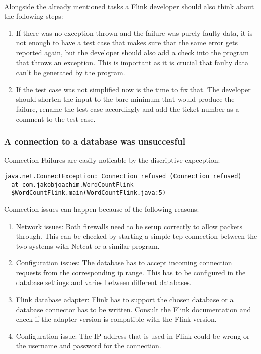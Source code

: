 \paragraph{} Alongside the already mentioned tasks a Flink developer should also think about the following steps:
\begin{enumerate}
  \item If there was no exception thrown and the failure was purely faulty data, it is not enough to have a test case that makes sure that the same error gets reported again, but the developer should also add a check into the program that throws an exception. This is important as it is crucial that faulty data can't be generated by the program.
  \item If the test case was not simplified now is the time to fix that. The developer should shorten the input to the bare minimum that would produce the failure, rename the test case accordingly and add the ticket number as a comment to the test case.
\end{enumerate}

\subsubsection{A connection to a database was unsuccesful}
Connection Failures are easily noticable by the discriptive expecption:
\begin{lstlisting}
java.net.ConnectException: Connection refused (Connection refused)
  at com.jakobjoachim.WordCountFlink
  $WordCountFlink.main(WordCountFlink.java:5)
\end{lstlisting}
Connection issues can happen because of the following reasons:
\begin{enumerate}
\item Network issues: Both firewalls need to be setup correctly to allow packets through. This can be checked by starting a simple tcp connection between the two systems with Netcat or a similar program.
\item Configuration issues: The database has to accept incoming connection requests from the corresponding ip range. This has to be configured in the database settings and varies between different databases.
\item Flink database adapter: Flink has to support the chosen database or a database connector has to be written. Consult the Flink documentation and check if the adapter version is compatible with the Flink version.
\item Configuration issue: The IP address that is used in Flink could be wrong or the username and password for the connection.
\end{enumerate}
